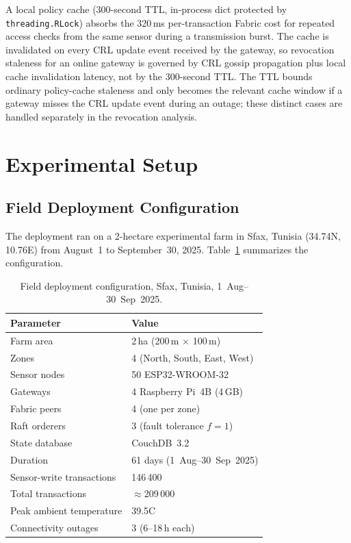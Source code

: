 \documentclass[a4paper,fleqn]{cas-dc}
\begin{document}
A local policy cache (300-second TTL, in-process dict protected by
\texttt{threading.RLock}) absorbs the 320\,ms per-transaction Fabric
cost for repeated access checks from the same sensor during a
transmission burst. The cache is invalidated on every CRL update
event received by the gateway, so revocation staleness for an online
gateway is governed by CRL gossip propagation plus local cache
invalidation latency, not by the 300-second TTL. The TTL bounds ordinary
policy-cache staleness and only becomes the relevant cache window if a
gateway misses the CRL update event during an outage; these distinct
cases are handled separately in the revocation analysis.

\section{Experimental Setup}
\label{sec:setup}

\subsection{Field Deployment Configuration}
\label{subsec:agri_setup}

The deployment ran on a 2-hectare experimental farm in Sfax, Tunisia
(34.74\textdegree{}N, 10.76\textdegree{}E) from August~1 to
September~30, 2025. Table~\ref{tab:deploy_config} summarizes the
configuration.

\begin{table}[pos=t]
\caption{Field deployment configuration, Sfax, Tunisia,
  1~Aug--30~Sep~2025.}
\label{tab:deploy_config}
\begin{tabularx}{\tblwidth}{@{}lX@{}}
\toprule
Parameter & Value \\
\midrule
Farm area & 2\,ha (200\,m $\times$ 100\,m) \\
Zones & 4 (North, South, East, West) \\
Sensor nodes & 50 ESP32-WROOM-32 \\
Gateways & 4 Raspberry Pi~4B (4\,GB) \\
Fabric peers & 4 (one per zone) \\
Raft orderers & 3 (fault tolerance $f{=}1$) \\
State database & CouchDB~3.2 \\
Duration & 61 days (1~Aug--30~Sep~2025) \\
Sensor-write transactions & 146\,400 \\
Total transactions & $\approx$209\,000 \\
Peak ambient temperature & 39.5\textdegree{}C \\
Connectivity outages & 3 (6--18\,h each) \\
\bottomrule
\end{tabularx}
\end{table}
\end{document}
